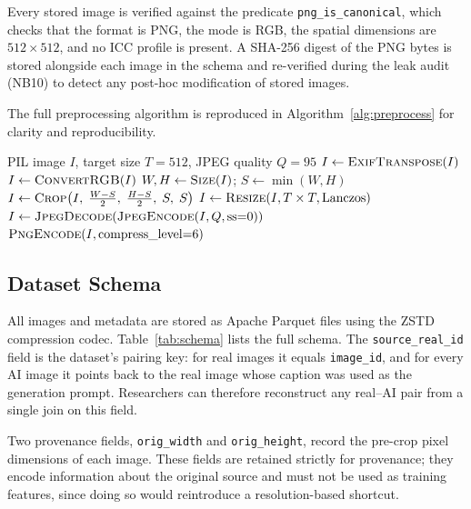 Every stored image is verified against the predicate
\texttt{png\_is\_canonical}, which checks that the format is PNG,
the mode is RGB, the spatial dimensions are $512 \times 512$, and
no ICC profile is present.
A SHA-256 digest of the PNG bytes is stored alongside each image in the
schema and re-verified during the leak audit (NB10) to detect any
post-hoc modification of stored images.

The full preprocessing algorithm is reproduced in
Algorithm~\ref{alg:preprocess} for clarity and reproducibility.

\begin{algorithm}[t]
\caption{Canonical preprocessing (applied identically to real and AI images)}
\label{alg:preprocess}
\begin{algorithmic}[1]
\Require PIL image $I$, target size $T = 512$, JPEG quality $Q = 95$
\State $I \leftarrow \textsc{ExifTranspose}(I)$
\State $I \leftarrow \textsc{ConvertRGB}(I)$
\State $W, H \leftarrow \textsc{Size}(I)$;
       $S \leftarrow \min(W, H)$
\State $I \leftarrow \textsc{Crop}\!\left(I,\;\tfrac{W-S}{2},\;\tfrac{H-S}{2},\;S,\;S\right)$
\State $I \leftarrow \textsc{Resize}(I, T \times T, \text{Lanczos})$
\State $I \leftarrow \textsc{JpegDecode}(\textsc{JpegEncode}(I, Q, \text{ss}{=}0))$
\State \Return $\textsc{PngEncode}(I, \text{compress\_level}{=}6)$
\end{algorithmic}
\end{algorithm}

\subsection{Dataset Schema}
\label{ssec:schema}

All images and metadata are stored as Apache Parquet files using the
ZSTD compression codec.
Table~\ref{tab:schema} lists the full schema.
The \texttt{source\_real\_id} field is the dataset's pairing key:
for real images it equals \texttt{image\_id}, and for every AI image
it points back to the real image whose caption was used as the
generation prompt.
Researchers can therefore reconstruct any real--AI pair from a single
join on this field.

Two provenance fields, \texttt{orig\_width} and \texttt{orig\_height},
record the pre-crop pixel dimensions of each image.
These fields are retained strictly for provenance; they encode
information about the original source and must not be used as training
features, since doing so would reintroduce a resolution-based shortcut.

